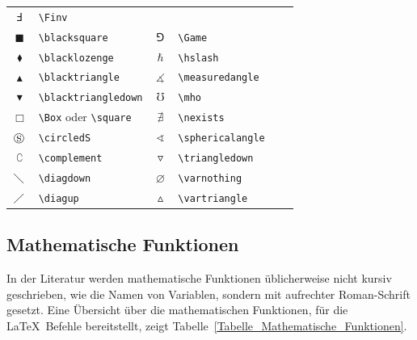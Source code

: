 \documentclass[a4paper,10pt,twoside]{scrbook}
\begin{document}
\begin{table}[h!tb]
\begin{tabular}{clclcl}
$\Finv$ & \texttt{\textbackslash Finv} \\
$\blacksquare$ & \texttt{\textbackslash blacksquare} & 
$\Game$ & \texttt{\textbackslash Game} \\
$\blacklozenge$ & \texttt{\textbackslash blacklozenge} &
$\hslash$ & \texttt{\textbackslash hslash} \\
$\blacktriangle$ & \texttt{\textbackslash blacktriangle} &
$\measuredangle$ & \texttt{\textbackslash measuredangle} \\
$\blacktriangledown$ & \texttt{\textbackslash blacktriangledown}&
$\mho$ & \texttt{\textbackslash mho} \\
$\Box$ & \texttt{\textbackslash Box} oder \texttt{\textbackslash square}&
$\nexists$ & \texttt{\textbackslash nexists} \\
$\circledS$ & \texttt{\textbackslash circledS} &
$\sphericalangle$ & \texttt{\textbackslash sphericalangle}\\
$\complement$ & \texttt{\textbackslash complement} &
$\triangledown$ & \texttt{\textbackslash triangledown} \\
$\diagdown$ & \texttt{\textbackslash diagdown} &
$\varnothing$ & \texttt{\textbackslash varnothing} \\
$\diagup$ & \texttt{\textbackslash diagup} &
$\vartriangle$ & \texttt{\textbackslash vartriangle} \\ 
\hline
\end{tabular}
\end{table}

\subsection{Mathematische Funktionen}

In der Literatur werden mathematische Funktionen üblicherweise nicht kursiv geschrieben, wie
die Namen von Variablen, sondern mit aufrechter Roman-Schrift gesetzt. Eine Übersicht über die mathematischen
Funktionen, für die \LaTeX\ Befehle bereitstellt, zeigt Tabelle~\ref{Tabelle_Mathematische_Funktionen}.
\end{document}
